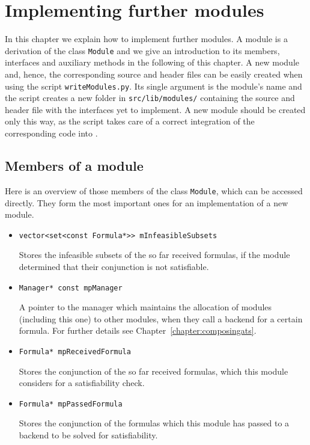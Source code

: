 \chapter{Implementing further modules}
\label{chapter:implementingamodule}
In this chapter we explain how to implement further modules. A module is a derivation
of the class \texttt{Module} and we give an 
introduction to its members, interfaces and auxiliary methods in the following of this
chapter. A new module and, hence, the corresponding \Cpp source and header files can be easily
created when using the script \texttt{writeModules.py}. Its single argument is the module's name
and the script creates a new folder in \texttt{src/lib/modules/} containing the
source and header file with the interfaces yet to implement. A new module should be created
only this way, as the script takes care of a correct integration of the corresponding code
into \smtrat.

\section{Members of a module}
Here is an overview of those members of the class \texttt{Module}, which can be accessed directly.
They form the most important ones for an implementation of a new module.

\begin{itemize}
	\item \begin{verbatim}vector<set<const Formula*>> mInfeasibleSubsets\end{verbatim}
		Stores the infeasible subsets of the so far received formulas, if the module determined that
		their conjunction is not satisfiable.
	\item \begin{verbatim}Manager* const mpManager\end{verbatim}
		A pointer to the manager which maintains the allocation of modules (including this one) to other 
		modules, when they call a backend for a certain formula. For further details see Chapter~\ref{chapter:composingats}.
	\item \begin{verbatim}Formula* mpReceivedFormula\end{verbatim}
		Stores the conjunction of the so far received formulas, which this module considers
		for a satisfiability check.
	\item \begin{verbatim}Formula* mpPassedFormula\end{verbatim}
		Stores the conjunction of the formulas which this module has passed to a backend to be
		solved for satisfiability.
\end{itemize}

